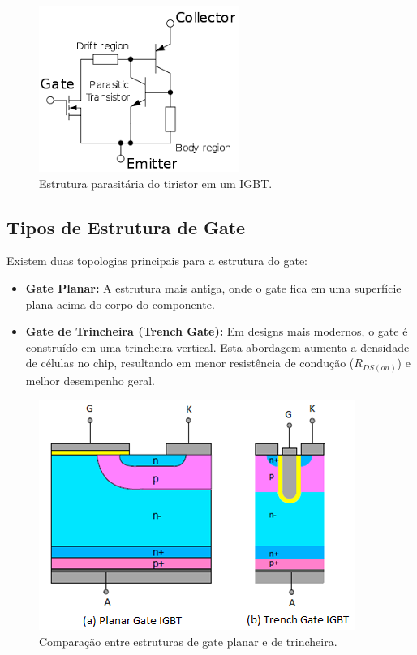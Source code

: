 \documentclass[12pt]{article}
\begin{document}
        \begin{figure}[!h]
            \centering
            \includegraphics[width=0.6\linewidth]{images/igbt-circuit-diagram.png}
            \caption{Estrutura parasitária do tiristor em um IGBT.}
            \label{fig:igbt_latchup}
        \end{figure}

        \subsection{Tipos de Estrutura de Gate}
        Existem duas topologias principais para a estrutura do gate:
        \begin{itemize}
            \item \textbf{Gate Planar:} A estrutura mais antiga, onde o gate fica em uma superfície plana acima do corpo do componente.
            \item \textbf{Gate de Trincheira (Trench Gate):} Em designs mais modernos, o gate é construído em uma trincheira vertical. Esta abordagem aumenta a densidade de células no chip, resultando em menor resistência de condução ($R_{DS(on)}$) e melhor desempenho geral.
        \end{itemize}

        \begin{figure}[!h]
            \centering
            \includegraphics[width=0.6\linewidth]{images/planar_trench_gate.png}
            \caption{Comparação entre estruturas de gate planar e de trincheira.\cite{phdthesis}}
            \label{fig:igbt_gate_types}
        \end{figure}
\end{document}
